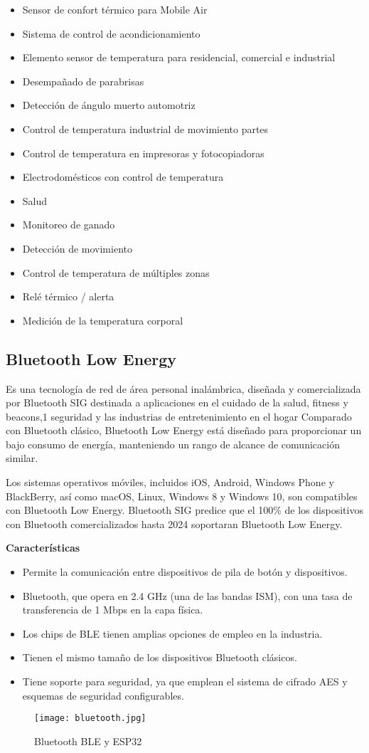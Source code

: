 \begin{itemize}
    \item Sensor de confort térmico para Mobile Air
    \item Sistema de control de acondicionamiento
    \item Elemento sensor de temperatura para residencial, comercial e industrial
    \item Desempañado de parabrisas
    \item Detección de ángulo muerto automotriz
    \item Control de temperatura industrial de movimiento partes
    \item Control de temperatura en impresoras y fotocopiadoras
    \item Electrodomésticos con control de temperatura
    \item Salud
    \item Monitoreo de ganado
    \item Detección de movimiento
    \item Control de temperatura de múltiples zonas
    \item Relé térmico / alerta
    \item Medición de la temperatura corporal
\end{itemize}

\subsection{Bluetooth Low Energy}
Es una tecnología de red de área personal inalámbrica, diseñada y comercializada por Bluetooth SIG destinada a aplicaciones en el cuidado de la salud, fitness y beacons,1 seguridad y las industrias de entretenimiento en el hogar Comparado con Bluetooth clásico, Bluetooth Low Energy está diseñado para proporcionar un bajo consumo de energía, manteniendo un rango de alcance de comunicación similar.

Los sistemas operativos móviles, incluidos iOS, Android, Windows Phone y BlackBerry, así como macOS, Linux, Windows 8 y Windows 10, son compatibles con Bluetooth Low Energy. Bluetooth SIG predice que el 100\% de los dispositivos con Bluetooth comercializados hasta 2024 soportaran Bluetooth Low Energy.

\textbf{Características}

\begin{itemize}
    \item Permite la comunicación entre dispositivos de pila de botón y dispositivos.
    \item Bluetooth, que opera en 2.4 GHz (una de las bandas ISM), con una tasa de transferencia de 1 Mbps en la capa física.
    \item Los chips de BLE tienen amplias opciones de empleo en la industria.
    \item Tienen el mismo tamaño de los dispositivos Bluetooth clásicos.
    \item Tiene soporte para seguridad, ya que emplean el sistema de cifrado AES y esquemas de seguridad configurables.

\end{itemize}

\begin{figure}[htp!]
    \centering
    \texttt{[image: bluetooth.jpg]}
    \caption{Bluetooth BLE y ESP32}
    \label{fig: Bluetooth}
\end{figure}\FloatBarrier

